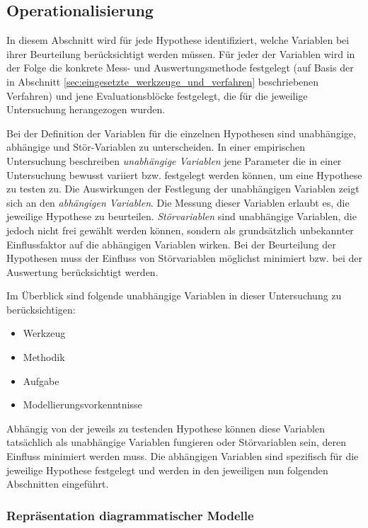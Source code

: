 \subsection{Operationalisierung} %
\label{sub:operationalisierung}

In diesem Abschnitt wird für jede Hypothese identifiziert, welche Variablen bei ihrer Beurteilung berücksichtigt werden müssen. Für jeder der Variablen wird in der Folge die konkrete Mess- und Auswertungsmethode festgelegt (auf Basis der in Abschnitt \ref{sec:eingesetzte_werkzeuge_und_verfahren} beschriebenen Verfahren) und jene Evaluationsblöcke festgelegt, die für die jeweilige Untersuchung herangezogen wurden.

Bei der Definition der Variablen für die einzelnen Hypothesen sind unabhängige, abhängige und Stör-Variablen zu unterscheiden. In einer empirischen Untersuchung beschreiben \emph{unabhängige Variablen} jene Parameter die in einer Untersuchung bewusst variiert bzw. festgelegt werden können, um eine Hypothese zu testen zu. Die Auswirkungen der Festlegung der unabhängigen Variablen zeigt sich an den \emph{abhängigen Variablen}. Die Messung dieser Variablen erlaubt es, die jeweilige Hypothese zu beurteilen. \emph{Störvariablen} sind unabhängige Variablen, die jedoch nicht frei gewählt werden können, sondern als grundsätzlich unbekannter Einflussfaktor auf die abhängigen Variablen wirken. Bei der Beurteilung der Hypothesen muss der Einfluss von Störvariablen möglichst minimiert bzw. bei der Auswertung berücksichtigt werden. 

Im Überblick sind folgende unabhängige Variablen in dieser Untersuchung zu berücksichtigen:

\begin{itemize}
	\item Werkzeug
	\item Methodik
	\item Aufgabe
	\item Modellierungsvorkenntnisse	
\end{itemize}

Abhängig von der jeweils zu testenden Hypothese können diese Variablen tatsächlich als unabhängige Variablen fungieren oder Störvariablen sein, deren Einfluss minimiert werden muss. Die abhängigen Variablen sind spezifisch für die jeweilige Hypothese festgelegt und werden in den jeweiligen nun folgenden Abschnitten eingeführt.

\subsubsection{Repräsentation diagrammatischer Modelle} %
\label{ssub:repräsentation}

